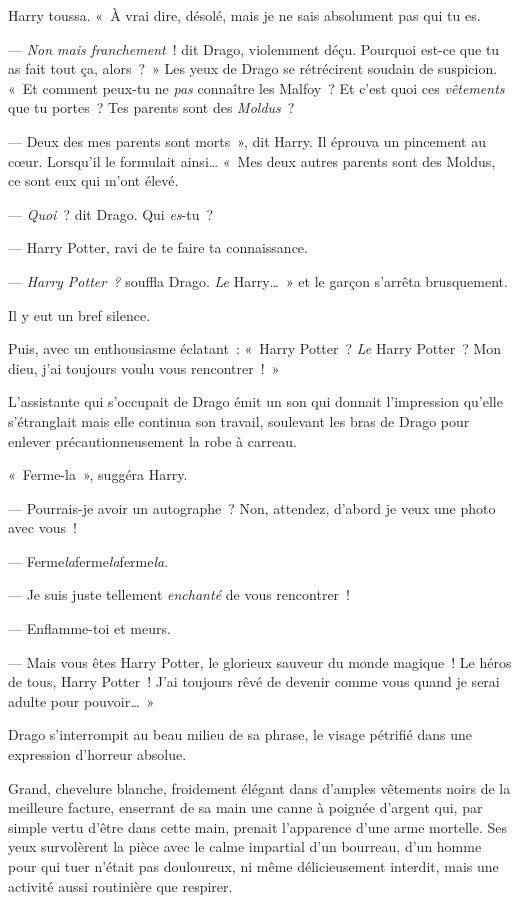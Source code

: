 Harry toussa. «~À vrai dire, désolé, mais je ne sais absolument pas qui tu es.

--- \emph{Non mais franchement}~! dit Drago, violemment déçu. Pourquoi est-ce que tu as fait tout ça, alors~?~» Les yeux de Drago se rétrécirent soudain de suspicion. «~Et comment peux-tu ne \emph{pas} connaître les Malfoy~? Et c'est quoi ces \emph{vêtements} que tu portes~? Tes parents sont des \emph{Moldus}~?

--- Deux des mes parents sont morts~», dit Harry. Il éprouva un pincement au cœur. Lorsqu'il le formulait ainsi… «~Mes deux autres parents sont des Moldus, ce sont eux qui m'ont élevé.

--- \emph{Quoi}~? dit Drago. Qui \emph{es}-tu~?

--- Harry Potter, ravi de te faire ta connaissance.

--- \emph{Harry Potter~?} souffla Drago. \emph{Le} Harry…~» et le garçon s'arrêta brusquement.

Il y eut un bref silence.

Puis, avec un enthousiasme éclatant~: «~Harry Potter~? \emph{Le} Harry Potter~? Mon dieu, j'ai toujours voulu vous rencontrer~!~»

L'assistante qui s'occupait de Drago émit un son qui donnait l'impression qu'elle s'étranglait mais elle continua son travail, soulevant les bras de Drago pour enlever précautionneusement la robe à carreau.

«~Ferme-la~», suggéra Harry.

--- Pourrais-je avoir un autographe~? Non, attendez, d'abord je veux une photo avec vous~!

--- Ferme\emph{la}ferme\emph{la}ferme\emph{la}.

--- Je suis juste tellement \emph{enchanté} de vous rencontrer~!

--- Enflamme-toi et meurs.

--- Mais vous êtes Harry Potter, le glorieux sauveur du monde magique~! Le héros de tous, Harry Potter~! J'ai toujours rêvé de devenir comme vous quand je serai adulte pour pouvoir…~»

Drago s'interrompit au beau milieu de sa phrase, le visage pétrifié dans une expression d'horreur absolue.

Grand, chevelure blanche, froidement élégant dans d'amples vêtements noirs de la meilleure facture, enserrant de sa main une canne à poignée d'argent qui, par simple vertu d'être dans cette main, prenait l'apparence d'une arme mortelle. Ses yeux survolèrent la pièce avec le calme impartial d'un bourreau, d'un homme pour qui tuer n'était pas douloureux, ni même délicieusement interdit, mais une activité aussi routinière que respirer.

